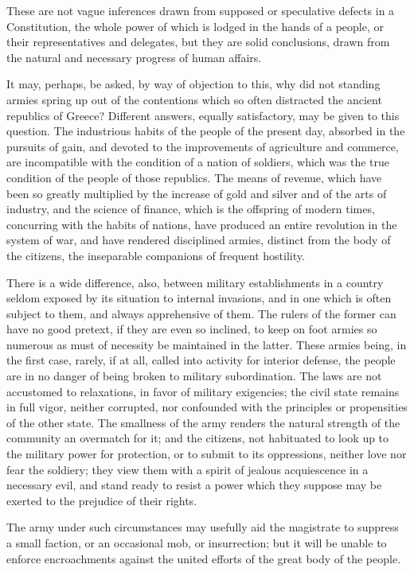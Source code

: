 These are not vague inferences drawn from supposed or speculative defects in a Constitution, the whole power of which is lodged in the hands of a people, or their representatives and delegates, but they are solid conclusions, drawn from the natural and necessary progress of human affairs.

It may, perhaps, be asked, by way of objection to this, why did not standing armies spring up out of the contentions which so often distracted the ancient republics of Greece? Different answers, equally satisfactory, may be given to this question. The industrious habits of the people of the present day, absorbed in the pursuits of gain, and devoted to the improvements of agriculture and commerce, are incompatible with the condition of a nation of soldiers, which was the true condition of the people of those republics. The means of revenue, which have been so greatly multiplied by the increase of gold and silver and of the arts of industry, and the science of finance, which is the offspring of modern times, concurring with the habits of nations, have produced an entire revolution in the system of war, and have rendered disciplined armies, distinct from the body of the citizens, the inseparable companions of frequent hostility.

There is a wide difference, also, between military establishments in a country seldom exposed by its situation to internal invasions, and in one which is often subject to them, and always apprehensive of them. The rulers of the former can have no good pretext, if they are even so inclined, to keep on foot armies so numerous as must of necessity be maintained in the latter. These armies being, in the first case, rarely, if at all, called into activity for interior defense, the people are in no danger of being broken to military subordination. The laws are not accustomed to relaxations, in favor of military exigencies; the civil state remains in full vigor, neither corrupted, nor confounded with the principles or propensities of the other state. The smallness of the army renders the natural strength of the community an overmatch for it; and the citizens, not habituated to look up to the military power for protection, or to submit to its oppressions, neither love nor fear the soldiery; they view them with a spirit of jealous acquiescence in a necessary evil, and stand ready to resist a power which they suppose may be exerted to the prejudice of their rights.

The army under such circumstances may usefully aid the magistrate to suppress a small faction, or an occasional mob, or insurrection; but it will be unable to enforce encroachments against the united efforts of the great body of the people.

